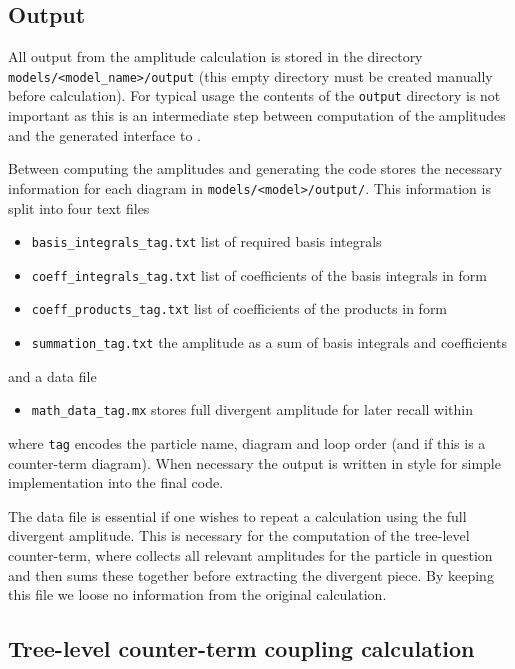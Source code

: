 \subsection{Output}

All output from the amplitude calculation is stored in the directory \lstinline{models/<model_name>/output} (this empty directory must be created manually before calculation).  For typical usage the contents of the \lstinline{output} directory is not important as this is an intermediate step between computation of the amplitudes and the generated \CC interface to \tsils.

Between computing the amplitudes and generating the code \mb stores the necessary information for each diagram in \lstinline{models/<model>/output/}.  This information is split into four text files
\begin{itemize}
\item \lstinline{basis_integrals_tag.txt} list of required basis integrals
\item \lstinline{coeff_integrals_tag.txt} list of coefficients of the basis integrals in \CC form
\item \lstinline{coeff_products_tag.txt} list of coefficients of the products in \CC form
\item \lstinline{summation_tag.txt} the amplitude as a sum of basis integrals and coefficients
\end{itemize}
and a \mathematica data file
\begin{itemize}
\item \lstinline{math_data_tag.mx} stores full divergent amplitude for later recall within \mathematica
\end{itemize}
where \lstinline{tag} encodes the particle name, diagram and loop order (and if this is a counter-term diagram).  When necessary the output is written in \CC style for simple implementation into the final code.

The \mathematica data file is essential if one wishes to repeat a calculation using the full divergent amplitude.  This is necessary for the computation of the tree-level counter-term, where \mb collects all relevant amplitudes for the particle in question and then sums these together before extracting the divergent piece.  By keeping this file we loose no information from the original calculation.

\subsection{Tree-level counter-term coupling calculation}\label{sec:ct}

